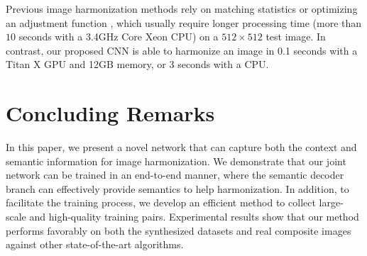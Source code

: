 \documentclass[10pt,twocolumn,letterpaper]{article}
\begin{document}
%
%
{}
%
Previous image harmonization methods rely on matching statistics \cite{Lalonde_ICCV_2007, Xue_siggraph_2012} or optimizing an adjustment function \cite{Zhu_ICCV_2015}, which usually require longer processing time (more than $10$ seconds with a 3.4GHz Core Xeon CPU) on a $512 \times 512$ test image.
%
In contrast, our proposed CNN is able to harmonize an image in 0.1 seconds with a Titan X GPU and
12GB memory, or $3$ seconds with a CPU.
%

\section{Concluding Remarks}
%
In this paper, we present a novel network that can capture both the context and semantic information for image harmonization.
%
We demonstrate that our joint network can be trained in an end-to-end manner, where the semantic decoder branch can effectively provide semantics to help harmonization.
%
In addition, to facilitate the training process, we develop an efficient method to collect large-scale and high-quality training pairs.
%
Experimental results show that our method performs favorably on both the synthesized datasets and real composite images against other state-of-the-art algorithms.
%

\clearpage
%
{\small


}
\end{document}
